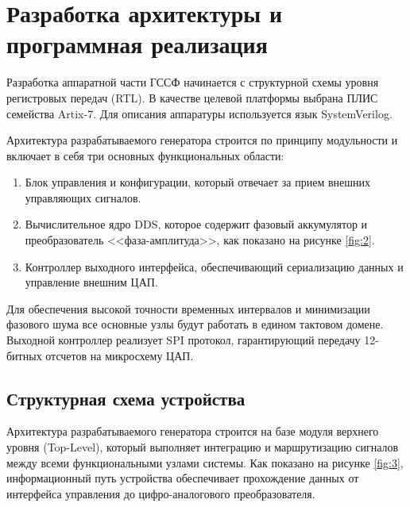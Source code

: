 \documentclass[12pt,a4paper,TimesNewRoman]{article}
\begin{document}
\section{Разработка архитектуры и программная реализация}

Разработка аппаратной части ГССФ начинается с структурной схемы уровня регистровых передач (RTL). В качестве целевой платформы выбрана ПЛИС семейства Artix-7. Для описания аппаратуры используется язык SystemVerilog.

Архитектура разрабатываемого генератора строится по принципу модульности и включает в себя три основных функциональных области:
\begin{enumerate}
    \item Блок управления и конфигурации, который отвечает за прием внешних управляющих сигналов.
    \item Вычислительное ядро DDS, которое содержит фазовый аккумулятор и преобразователь <<фаза-амплитуда>>, как показано на рисунке \ref{fig:2}.
    \item Контроллер выходного интерфейса, обеспечивающий сериализацию данных и управление внешним ЦАП.
\end{enumerate}

Для обеспечения высокой точности временных интервалов и минимизации фазового шума все основные узлы будут работать в едином тактовом домене. Выходной контроллер реализует SPI протокол, гарантирующий передачу 12-битных отсчетов на микросхему ЦАП.

\subsection{Структурная схема устройства}
Архитектура разрабатываемого генератора строится на базе модуля верхнего уровня (Top-Level), который выполняет интеграцию и маршрутизацию сигналов между всеми функциональными узлами системы. Как показано на рисунке \ref{fig:3}, информационный путь устройства обеспечивает прохождение данных от интерфейса управления до цифро-аналогового преобразователя.
\end{document}
